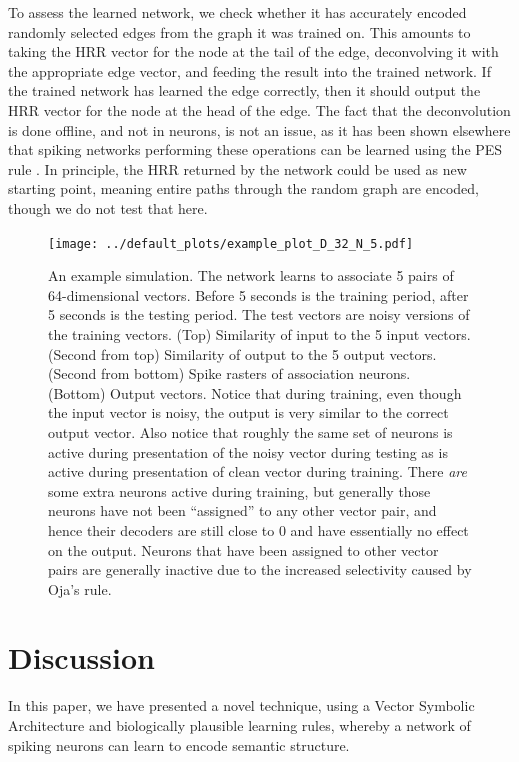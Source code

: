 \documentclass[10pt,letterpaper]{article}
\begin{document}
To assess the learned network, we check whether it has accurately encoded randomly selected edges from the graph it was trained on. This amounts to taking the HRR vector for the node at the tail of the edge, deconvolving it with the appropriate edge vector, and feeding the result into the trained network. If the trained network has learned the edge correctly, then it should output the HRR vector for the node at the head of the edge. The fact that the deconvolution is done offline, and not in neurons, is not an issue, as it has been shown elsewhere that spiking networks performing these operations can be learned using the PES rule \citep{Stewart2011a}. In principle, the HRR returned by the network could be used as new starting point, meaning entire paths through the random graph are encoded, though we do not test that here. 

\begin{figure}[ht]
\begin{center}
\texttt{[image: ../default\_plots/example\_plot\_D\_32\_N\_5.pdf]}
\end{center}
\caption{An example simulation. The network learns to associate 5 pairs of 64-dimensional vectors. Before 5 seconds is the training period, after 5 seconds is the testing period. The test vectors are noisy versions of the training vectors. (Top) Similarity of input to the 5 input vectors. (Second from top) Similarity of output to the 5 output vectors. (Second from bottom) Spike rasters of association neurons. (Bottom) Output vectors. Notice that during training, even though the input vector is noisy, the output is very similar to the correct output vector. Also notice that roughly the same set of neurons is active during presentation of the noisy vector during testing as is active during presentation of clean vector during training. There \textit{are} some extra neurons active during training, but generally those neurons have not been ``assigned'' to any other vector pair, and hence their decoders are still close to 0 and have essentially no effect on the output. Neurons that have been assigned to other vector pairs are generally inactive due to the increased selectivity caused by Oja's rule. }
\label{fig:example}
\end{figure}

\section{Discussion}
In this paper, we have presented a novel technique, using a Vector Symbolic Architecture and biologically plausible learning rules, whereby a network of spiking neurons can learn to encode semantic structure.
\end{document}
